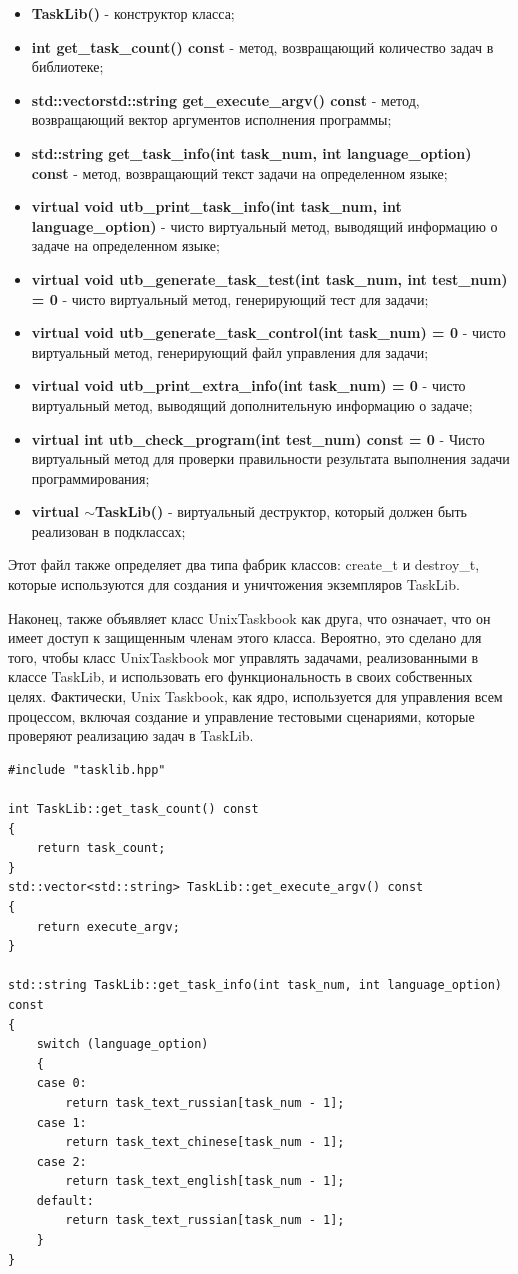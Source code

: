 \begin{itemize}
\item \textbf{TaskLib()} - конструктор класса;
\item \textbf{int get\_task\_count() const} - метод, возвращающий количество задач в библиотеке;
\item \textbf{std::vectorstd::string get\_execute\_argv() const} - метод, возвращающий вектор аргументов исполнения программы;
\item \textbf{std::string get\_task\_info(int task\_num, int language\_option) const} - метод, возвращающий текст задачи на определенном языке;
\item \textbf{virtual void utb\_print\_task\_info(int task\_num, int language\_option)} - чисто виртуальный метод, выводящий информацию о задаче на определенном языке;
\item \textbf{virtual void utb\_generate\_task\_test(int task\_num, int test\_num) = 0} - чисто виртуальный метод, генерирующий тест для задачи;
\item \textbf{virtual void utb\_generate\_task\_control(int task\_num) = 0} - чисто виртуальный метод, генерирующий файл управления для задачи;
\item \textbf{virtual void utb\_print\_extra\_info(int task\_num) = 0} - чисто виртуальный метод, выводящий дополнительную информацию о задаче;
\item \textbf{virtual int utb\_check\_program(int test\_num) const = 0} - Чисто виртуальный метод для проверки правильности результата выполнения задачи программирования;
\item \textbf{virtual $\sim$TaskLib()} - виртуальный деструктор, который должен быть реализован в подклассах;
\end{itemize}

Этот файл также определяет два типа фабрик классов: create\_t и destroy\_t, которые
используются для создания и уничтожения экземпляров TaskLib.

Наконец, также объявляет класс UnixTaskbook как друга, что означает, что он имеет доступ к 
защищенным членам этого класса. Вероятно, это сделано для того, чтобы класс UnixTaskbook мог 
управлять задачами, реализованными в классе TaskLib, и использовать его функциональность в 
своих собственных целях. Фактически, Unix Taskbook, как ядро, используется для управления всем процессом, включая создание и управление тестовыми сценариями, которые проверяют реализацию задач в TaskLib.

\lstset{language=c++}
\begin{lstlisting}
#include "tasklib.hpp"

int TaskLib::get_task_count() const
{
	return task_count;
}
std::vector<std::string> TaskLib::get_execute_argv() const
{
	return execute_argv;
}

std::string TaskLib::get_task_info(int task_num, int language_option) const
{
	switch (language_option)
	{
	case 0:
		return task_text_russian[task_num - 1];
	case 1:
		return task_text_chinese[task_num - 1];
	case 2:
		return task_text_english[task_num - 1];
	default:
		return task_text_russian[task_num - 1];
	}
}
\end{lstlisting}

